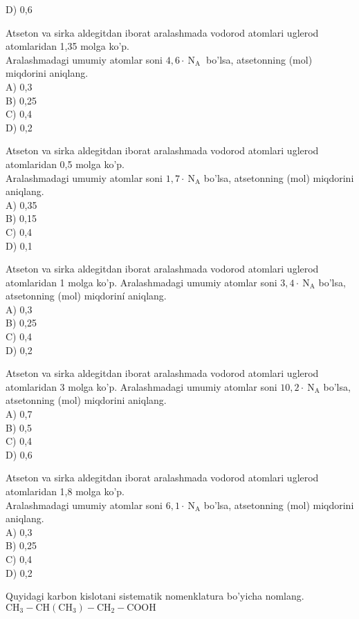 D) 0,6
  \item Atseton va sirka aldegitdan iborat aralashmada vodorod atomlari uglerod atomlaridan 1,35 molga ko'p.\\
Aralashmadagi umumiy atomlar soni $4,6 \cdot \mathrm{~N}_{\text {A }}$ bo'lsa, atsetonning (mol) miqdorini aniqlang.\\
A) 0,3\\
B) 0,25\\
C) 0,4\\
D) 0,2
  \item Atseton va sirka aldegitdan iborat aralashmada vodorod atomlari uglerod atomlaridan 0,5 molga ko'p.\\
Aralashmadagi umumiy atomlar soni $1,7 \cdot \mathrm{~N}_{\mathrm{A}}$ bo'lsa, atsetonning (mol) miqdorini aniqlang.\\
A) 0,35\\
B) 0,15\\
C) 0,4\\
D) 0,1
  \item Atseton va sirka aldegitdan iborat aralashmada vodorod atomlari uglerod atomlaridan 1 molga ko'p. Aralashmadagi umumiy atomlar soni $3,4 \cdot \mathrm{~N}_{\mathrm{A}}$ bo'lsa, atsetonning (mol) miqdoriní aniqlang.\\
A) 0,3\\
B) 0,25\\
C) 0,4\\
D) 0,2
  \item Atseton va sirka aldegitdan iborat aralashmada vodorod atomlari uglerod atomlaridan 3 molga ko'p. Aralashmadagi umumiy atomlar soni $10,2 \cdot \mathrm{~N}_{\mathrm{A}}$ bo'lsa, atsetonning (mol) miqdorini aniqlang.\\
A) 0,7\\
B) 0,5\\
C) 0,4\\
D) 0,6
  \item Atseton va sirka aldegitdan iborat aralashmada vodorod atomlari uglerod atomlaridan 1,8 molga ko'p.\\
Aralashmadagi umumiy atomlar soni $6,1 \cdot \mathrm{~N}_{\mathrm{A}}$ bo'lsa, atsetonning (mol) miqdorini aniqlang.\\
A) 0,3\\
B) 0,25\\
C) 0,4\\
D) 0,2
  \item Quyidagi karbon kislotani sistematik nomenklatura bo'yicha nomlang.\\
$\mathrm{CH}_{3}-\mathrm{CH}\left(\mathrm{CH}_{3}\right)-\mathrm{CH}_{2}-\mathrm{COOH}$\\
